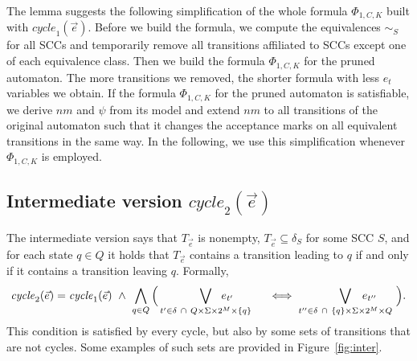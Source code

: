 \documentclass[a4paper,UKenglish,cleveref,autoref,thm-restate]{lipics-v2021}
\newcommand{\rem}{\mathit{nm}}
\newcommand{\mcycle}{\mathit{cycle}}
\newcommand{\Te}{T_{\vec{e}}}
\begin{document}
The lemma suggests the following simplification of the whole formula
$\Phi_{1,C,K}$ built with $\mcycle_1(\vec{e})$. Before we build the
formula, we compute the equivalences $\sim_S$ for all SCCs and
temporarily remove all transitions affiliated to SCCs except one of
each equivalence class. Then we build the formula $\Phi_{1,C,K}$ for
the pruned automaton. The more transitions we removed, the shorter
formula with less $e_t$ variables we obtain. If the formula
$\Phi_{1,C,K}$ for the pruned automaton is satisfiable, we derive
$\rem$ and $\psi$ from its model and extend %
$\rem$ to all transitions of the original automaton such that
it changes the acceptance marks on all equivalent transitions in the
same way. In the following, we use this simplification whenever
$\Phi_{1,C,K}$ is employed.


\subsection{Intermediate version $\mcycle_2(\vec{e})$}
The intermediate version says that $\Te$ is nonempty,
$\Te\subseteq\delta_S$ for some SCC $S$, and for each state $q\in Q$
it holds that $\Te$ contains a transition leading to $q$ if and only
if it contains a transition leaving $q$. Formally,
\[
  \mcycle_2(\vec{e})=\mcycle_1(\vec{e})~\wedge~
  \bigwedge_{q\in Q}\Big(\bigvee_{t'\in\delta~\cap~Q\times\Sigma\times 2^M\times\{q\}}\hspace{-1cm}e_{t'}\hspace{1cm}\iff
  \bigvee_{t''\in\delta~\cap~\{q\}\times\Sigma\times 2^M\times Q}\hspace{-1cm}e_{t''}\hspace{6mm}\Big).
\]
This condition is satisfied by every cycle, but also by some sets of
transitions that are not cycles. Some examples of such sets are provided in Figure~\ref{fig:inter}.
\end{document}
